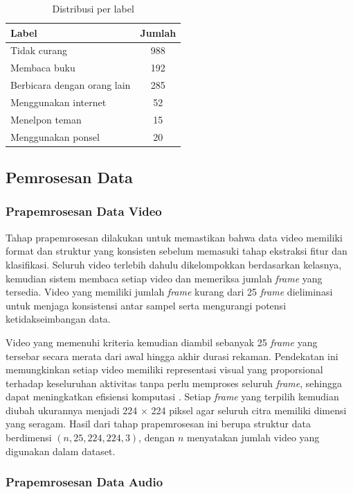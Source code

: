 \documentclass {rapidsart}
\theoremstyle{plain}
\theoremstyle{remark}
\theoremstyle{definition}
\begin{document}
\begin{table}[htbp]
\caption{Distribusi per label}
\label{tab:distribusi_label}
\centering
\begin{tabular*}{0.6\textwidth}{@{\extracolsep{\fill}}lc@{}}
\hline
\textbf{Label} & \textbf{Jumlah} \\
\hline
Tidak curang & 988 \\
Membaca buku & 192 \\
Berbicara dengan orang lain & 285 \\
Menggunakan internet & 52 \\
Menelpon teman & 15 \\
Menggunakan ponsel & 20 \\
\hline
\end{tabular*}
\end{table}



\subsection{Pemrosesan Data}
\subsubsection{Prapemrosesan Data Video}

Tahap prapemrosesan dilakukan untuk memastikan bahwa data video memiliki format dan struktur yang konsisten sebelum memasuki tahap ekstraksi fitur dan klasifikasi. Seluruh video terlebih dahulu dikelompokkan berdasarkan kelasnya, kemudian sistem membaca setiap video dan memeriksa jumlah \textit{frame} yang tersedia. Video yang memiliki jumlah \textit{frame} kurang dari 25 \textit{frame} dieliminasi untuk menjaga konsistensi antar sampel serta mengurangi potensi ketidakseimbangan data.

Video yang memenuhi kriteria kemudian diambil sebanyak 25 \textit{frame} yang tersebar secara merata dari awal hingga akhir durasi rekaman. Pendekatan ini memungkinkan setiap video memiliki representasi visual yang proporsional terhadap keseluruhan aktivitas tanpa perlu memproses seluruh \textit{frame}, sehingga dapat meningkatkan efisiensi komputasi \citep{Shen2025}. Setiap \textit{frame} yang terpilih kemudian diubah ukurannya menjadi 224 $\times$ 224 piksel agar seluruh citra memiliki dimensi yang seragam. Hasil dari tahap prapemrosesan ini berupa struktur data berdimensi $(n, 25, 224, 224, 3)$, dengan $n$ menyatakan jumlah video yang digunakan dalam dataset.

\subsubsection{Prapemrosesan Data Audio}
\end{document}
